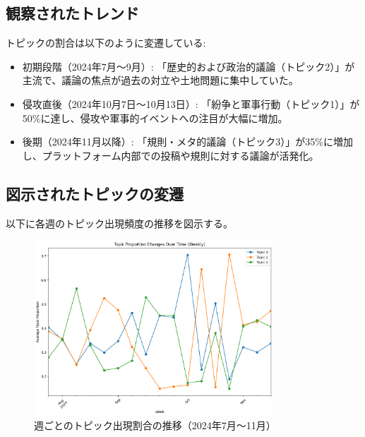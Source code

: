 \documentclass[11pt, a4j]{jreport}
\begin{document}
    \begin{table}[H]
    \centering
    \caption{各週におけるトピックの割合}
    \label{tab:topic_ratios}
    \end{table}

    \subsection*{観察されたトレンド}
    トピックの割合は以下のように変遷している:
    \begin{itemize}
        \item 初期段階（2024年7月～9月）: 「歴史的および政治的議論（トピック2）」が主流で、議論の焦点が過去の対立や土地問題に集中していた。
        \item 侵攻直後（2024年10月7日～10月13日）: 「紛争と軍事行動（トピック1）」が50\%に達し、侵攻や軍事的イベントへの注目が大幅に増加。
        \item 後期（2024年11月以降）: 「規則・メタ的議論（トピック3）」が35\%に増加し、プラットフォーム内部での投稿や規則に対する議論が活発化。
    \end{itemize}

    \subsection*{図示されたトピックの変遷}
    以下に各週のトピック出現頻度の推移を図示する。

    \begin{figure}[H]
        \centering
        \includegraphics[width=0.8\textwidth]{topic_trends_plot.png}
        \caption{週ごとのトピック出現割合の推移（2024年7月～11月）}
        \label{fig:topic_trends}
    \end{figure}
\end{document}
